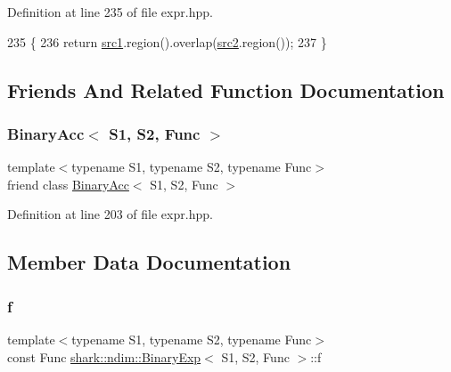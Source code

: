 Definition at line 235 of file expr.\+hpp.


\begin{DoxyCode}
235                                                                                         \{
236             \textcolor{keywordflow}{return} \hyperlink{classshark_1_1ndim_1_1_binary_exp_adca0646eb1ee123dc4312644a39ffdb6}{src1}.region().overlap(\hyperlink{classshark_1_1ndim_1_1_binary_exp_a42495dbe9f1fdc13b53fc53d21c847a1}{src2}.region());
237         \}
\end{DoxyCode}


\subsection{Friends And Related Function Documentation}
\hypertarget{classshark_1_1ndim_1_1_binary_exp_a9059dceb0cce6c1f29ca58228b6746bc}{}\label{classshark_1_1ndim_1_1_binary_exp_a9059dceb0cce6c1f29ca58228b6746bc} 
\subsubsection{\texorpdfstring{Binary\+Acc$<$ S1, S2, Func $>$}{BinaryAcc< S1, S2, Func >}}
{\footnotesize\ttfamily template$<$typename S1, typename S2, typename Func$>$ \\
friend class \hyperlink{classshark_1_1ndim_1_1_binary_acc}{Binary\+Acc}$<$ S1, S2, Func $>$\hspace{0.3cm}{\ttfamily [friend]}}



Definition at line 203 of file expr.\+hpp.



\subsection{Member Data Documentation}
\hypertarget{classshark_1_1ndim_1_1_binary_exp_a96d3a36d75f44be439e3550d40135714}{}\label{classshark_1_1ndim_1_1_binary_exp_a96d3a36d75f44be439e3550d40135714} 
\subsubsection{\texorpdfstring{f}{f}}
{\footnotesize\ttfamily template$<$typename S1, typename S2, typename Func$>$ \\
const Func \hyperlink{classshark_1_1ndim_1_1_binary_exp}{shark\+::ndim\+::\+Binary\+Exp}$<$ S1, S2, Func $>$\+::f\hspace{0.3cm}{\ttfamily [private]}}



